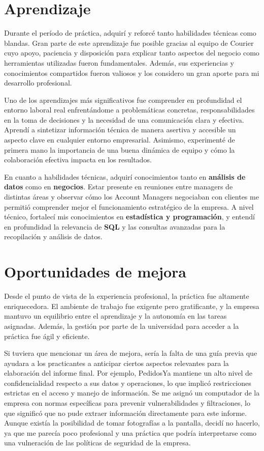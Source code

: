 \section{Aprendizaje}

Durante el período de práctica, adquirí y reforcé tanto habilidades técnicas como blandas. Gran parte de este aprendizaje fue posible gracias al equipo de Courier cuyo apoyo, paciencia y disposición para explicar tanto aspectos del negocio como herramientas utilizadas fueron fundamentales. Además, sus experiencias y conocimientos compartidos fueron valiosos y los considero un gran aporte para mi desarrollo profesional.

Uno de los aprendizajes más significativos fue comprender en profundidad el entorno laboral real enfrentándome a problemáticas concretas, responsabilidades en la toma de decisiones y la necesidad de una comunicación clara y efectiva. Aprendí a sintetizar información técnica de manera asertiva y accesible un aspecto clave en cualquier entorno empresarial. Asimismo, experimenté de primera mano la importancia de una buena dinámica de equipo y cómo la colaboración efectiva impacta en los resultados.

En cuanto a habilidades técnicas, adquirí conocimientos tanto en \textbf{análisis de datos} como en \textbf{negocios}. Estar presente en reuniones entre managers de distintas áreas y observar cómo los Account Managers negociaban con clientes me permitió comprender mejor el funcionamiento estratégico de la empresa. A nivel técnico, fortalecí mis conocimientos en \textbf{estadística y programación}, y entendí en profundidad la relevancia de \textbf{SQL} y las consultas avanzadas para la recopilación y análisis de datos.

\section{Oportunidades de mejora}

Desde el punto de vista de la experiencia profesional, la práctica fue altamente enriquecedora. El ambiente de trabajo fue exigente pero gratificante, y la empresa mantuvo un equilibrio entre el aprendizaje y la autonomía en las tareas asignadas. Además, la gestión por parte de la universidad para acceder a la práctica fue ágil y eficiente.

Si tuviera que mencionar un área de mejora, sería la falta de una guía previa que ayudara a los practicantes a anticipar ciertos aspectos relevantes para la elaboración del informe final. Por ejemplo, PedidosYa mantiene un alto nivel de confidencialidad respecto a sus datos y operaciones, lo que implicó restricciones estrictas en el acceso y manejo de información. Se me asignó un computador de la empresa con normas específicas para prevenir vulnerabilidades y filtraciones, lo que significó que no pude extraer información directamente para este informe. Aunque existía la posibilidad de tomar fotografías a la pantalla, decidí no hacerlo, ya que me parecía poco profesional y una práctica que podría interpretarse como una vulneración de las políticas de seguridad de la empresa.

